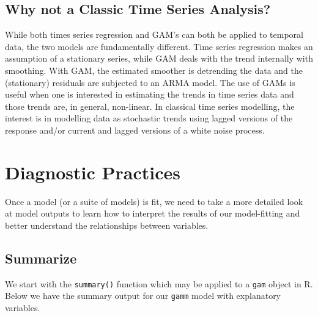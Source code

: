 \documentclass[
]{book}
\newenvironment{Shaded}{\begin{snugshade}}{\end{snugshade}}
\newcommand{\CommentTok}[1]{\textcolor[rgb]{0.56,0.35,0.01}{\textit{#1}}}
\newcommand{\FunctionTok}[1]{\textcolor[rgb]{0.00,0.00,0.00}{#1}}
\newcommand{\NormalTok}[1]{#1}
\newcommand{\SpecialCharTok}[1]{\textcolor[rgb]{0.00,0.00,0.00}{#1}}
\begin{document}
\hypertarget{why-not-a-classic-time-series-analysis}{%
\subsection{Why not a Classic Time Series Analysis?}\label{why-not-a-classic-time-series-analysis}}

While both times series regression and GAM's can both be applied to temporal data, the two models are fundamentally different. Time series regression makes an assumption of a stationary series, while GAM deals with the trend internally with smoothing. With GAM, the estimated smoother is detrending the data and the (stationary) residuals are subjected to an ARMA model. The use of GAMs is useful when one is interested in estimating the trends in time series data and those trends are, in general, non-linear. In classical time series modelling, the interest is in modelling data as stochastic trends using lagged versions of the response and/or current and lagged versions of a white noise process.

\hypertarget{Diag}{%
\section{Diagnostic Practices}\label{Diag}}

Once a model (or a suite of models) is fit, we need to take a more detailed look at model outputs to learn how to interpret the results of our model-fitting and better understand the relationships between variables.

\hypertarget{summarize}{%
\subsection{Summarize}\label{summarize}}

We start with the \texttt{summary()} function which may be applied to a \texttt{gam} object in R. Below we have the summary output for our \texttt{gamm} model with explanatory variables.

\begin{Shaded}
\end{Shaded}
\end{document}
